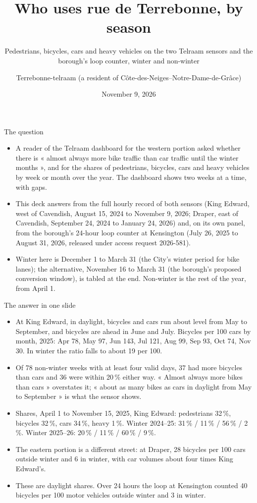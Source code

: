 \documentclass[aspectratio=169,10pt]{beamer}\usetheme{default}\usecolortheme{seahorse}\setbeamertemplate{navigation symbols}{}\setbeamertemplate{footline}[frame number]
\title{Who uses rue de Terrebonne, by season}\subtitle{Pedestrians, bicycles, cars and heavy vehicles on the two Telraam sensors and the borough\textquoteright{}s loop counter, winter and non-winter}\author{Terrebonne-telraam (a resident of Côte-des-Neiges--Notre-Dame-de-Grâce)}\date{November 9, 2026}
\begin{document}
\begin{frame}\titlepage\end{frame}
\begin{frame}{The question}\begin{itemize}
\item A reader of the Telraam dashboard for the western portion asked whether there is « almost always more bike traffic than car traffic until the winter months », and for the shares of pedestrians, bicycles, cars and heavy vehicles by week or month over the year. The dashboard shows two weeks at a time, with gaps.
\item This deck answers from the full hourly record of both sensors (King Edward, west of Cavendish, August 15, 2024 to November 9, 2026; Draper, east of Cavendish, September 24, 2024 to January 24, 2026) and, on its own panel, from the borough\textquoteright{}s 24-hour loop counter at Kensington (July 26, 2025 to August 31, 2026, released under access request 2026-581).
\item Winter here is December 1 to March 31 (the City\textquoteright{}s winter period for bike lanes); the alternative, November 16 to March 31 (the borough\textquoteright{}s proposed conversion window), is tabled at the end. Non-winter is the rest of the year, from April 1.
\end{itemize}\end{frame}
\begin{frame}{The answer in one slide}\begin{itemize}
\item At King Edward, in daylight, bicycles and cars run about level from May to September, and bicycles are ahead in June and July. Bicycles per 100 cars by month, 2025: Apr 78, May 97, Jun 143, Jul 121, Aug 99, Sep 93, Oct 74, Nov 30. In winter the ratio falls to about 19 per 100.
\item Of 78 non-winter weeks with at least four valid days, 37 had more bicycles than cars and 36 were within 20\,\% either way. « Almost always more bikes than cars » overstates it; « about as many bikes as cars in daylight from May to September » is what the sensor shows.
\item Shares, April 1 to November 15, 2025, King Edward: pedestrians 32\,\%, bicycles 32\,\%, cars 34\,\%, heavy 1\,\%. Winter 2024--25: 31\,\% / 11\,\% / 56\,\% / 2\,\%. Winter 2025--26: 20\,\% / 11\,\% / 60\,\% / 9\,\%.
\item The eastern portion is a different street: at Draper, 28 bicycles per 100 cars outside winter and 6 in winter, with car volumes about four times King Edward\textquoteright{}s.
\item These are daylight shares. Over 24 hours the loop at Kensington counted 40 bicycles per 100 motor vehicles outside winter and 3 in winter.
\end{itemize}\end{frame}
\end{document}
